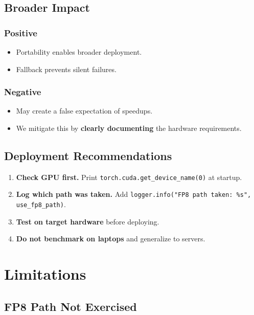 \subsection{Broader Impact}

\subsubsection{Positive}

\begin{itemize}
\item Portability enables broader deployment.
\item Fallback prevents silent failures.

\end{itemize}
\subsubsection{Negative}

\begin{itemize}
\item May create a false expectation of speedups.
\item We mitigate this by \textbf{clearly documenting} the hardware requirements.

\end{itemize}
\subsection{Deployment Recommendations}

\begin{enumerate}
\item \textbf{Check GPU first.} Print \texttt{torch.cuda.get\_device\_name(0)} at startup.
\item \textbf{Log which path was taken.} Add \texttt{logger.info("FP8 path taken: \%s", use\_fp8\_path)}.
\item \textbf{Test on target hardware} before deploying.
\item \textbf{Do not benchmark on laptops} and generalize to servers.

\end{enumerate}



\section{Limitations}

\subsection{FP8 Path Not Exercised}

